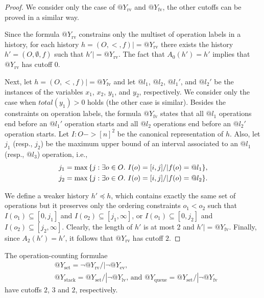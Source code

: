 \begin{proof}

  We consider only the case of $@Y_\mathrm{rv}$ and $@Y_\mathrm{fv}$, the other
  cutoffs can be proved in a similar way.
 
  Since the formula $@Y_\mathrm{rv}$ constrains only the multiset of operation
  labels in a history, for each history $h=(O,<,f) |= @Y_\mathrm{rv}$ there
  exists the history $h'=(O,\emptyset,f)$ such that $h' |= @Y_\mathrm{rv}$. The
  fact that $A_0(h')=h'$ implies that $@Y_\mathrm{rv}$ has cutoff $0$.
 
  Next, let $h=(O,<,f) |= @Y_\mathrm{fv}$ and let $@l_1$, $@l_2$, $@l_1'$, and
  $@l_2'$ be the instances of the variables $x_1$, $x_2$, $y_1$, and $y_2$,
  respectively. We consider only the case when $total(y_1)>0$ holds (the other
  case is similar). Besides the constraints on operation labels, the formula
  $@Y_\mathrm{fv}$ states that all $@l_1$ operations end before an $@l_1'$
  operation starts and all $@l_2$ operations end before an $@l_2'$ operation
  starts. Let $I:O->[n]^2$ be the canonical representation of $h$. Also, let
  $j_1$ (resp., $j_2$) be the maximum upper bound of an interval associated to
  an $@l_1$ (resp., $@l_3$) operation, i.e.,
  \begin{align*}
    j_1 = \max{\{ j:\exists o\in O.\ I(o) = [i,j] /| f(o)=@l_1 \}},\\
    j_2 = \max{\{ j:\exists o\in O.\ I(o) = [i,j] /| f(o)=@l_2 \}}.
  \end{align*}
 
  We define a weaker history $h'\preceq h$, which contains exactly the same set
  of operations but it preserves only the ordering constraints $o_1<o_2$ such
  that $I(o_1)\subseteq [0,j_1]$ and $I(o_2)\subseteq [j_1,\infty]$, or
  $I(o_1)\subseteq [0,j_2]$ and $I(o_2)\subseteq [j_2,\infty]$. Clearly, the
  length of $h'$ is at most 2
  and $h'|= @Y_\mathrm{fv}$. Finally, since $A_2(h')=h'$, it follows that
  $@Y_\mathrm{rv}$ has cutoff $2$.
\end{proof}

\begin{corollary}

  The operation-counting formulae
  \begin{align*}
    & @Y_\mathrm{set}   = \lnot @Y_\mathrm{rv} /| \lnot @Y_\mathrm{ev}
    \text{, } \\
    & @Y_\mathrm{stack} = @Y_\mathrm{set} /| \lnot @Y_\mathrm{lv}
    \text{, and }
    @Y_\mathrm{queue} = @Y_\mathrm{set} /| \lnot @Y_\mathrm{fv}
  \end{align*}
  have cutoffs $2$, $3$ and $2$, respectively.

\end{corollary}

